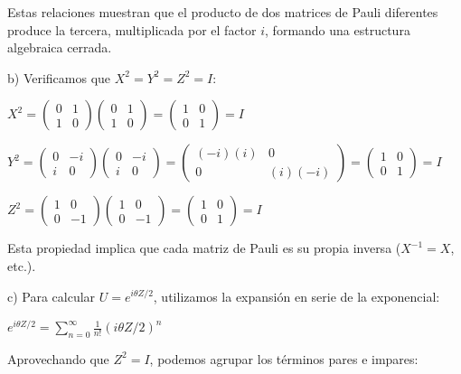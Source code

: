 \begin{questions}
\begin{solution}
    Estas relaciones muestran que el producto de dos matrices de Pauli diferentes produce la tercera, multiplicada por el factor $i$, formando una estructura algebraica cerrada.

    b) Verificamos que $X^2 = Y^2 = Z^2 = I$:

    $X^2 = \begin{pmatrix} 0 & 1 \\ 1 & 0 \end{pmatrix} \begin{pmatrix} 0 & 1 \\ 1 & 0 \end{pmatrix} = \begin{pmatrix} 1 & 0 \\ 0 & 1 \end{pmatrix} = I$

    $Y^2 = \begin{pmatrix} 0 & -i \\ i & 0 \end{pmatrix} \begin{pmatrix} 0 & -i \\ i & 0 \end{pmatrix} = \begin{pmatrix} (-i)(i) & 0 \\ 0 & (i)(-i) \end{pmatrix} = \begin{pmatrix} 1 & 0 \\ 0 & 1 \end{pmatrix} = I$

    $Z^2 = \begin{pmatrix} 1 & 0 \\ 0 & -1 \end{pmatrix} \begin{pmatrix} 1 & 0 \\ 0 & -1 \end{pmatrix} = \begin{pmatrix} 1 & 0 \\ 0 & 1 \end{pmatrix} = I$

    Esta propiedad implica que cada matriz de Pauli es su propia inversa ($X^{-1} = X$, etc.).

    c) Para calcular $U = e^{i\theta Z/2}$, utilizamos la expansión en serie de la exponencial:

    $e^{i\theta Z/2} = \sum_{n=0}^{\infty} \frac{1}{n!}(i\theta Z/2)^n$

    Aprovechando que $Z^2 = I$, podemos agrupar los términos pares e impares:


\end{solution}
\end{questions}

